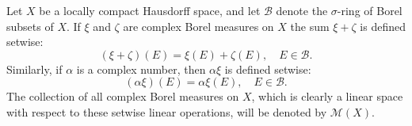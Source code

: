 Let $X$ be a locally compact Hausdorff space, and let $\mathcal{B}$ denote the $\sigma$-ring of Borel subsets of $X$. If $\xi$ and $\zeta$ are complex Borel measures on $X$ the sum $\xi + \zeta$ is defined setwise:
$$(\xi + \zeta)(E) = \xi(E) + \zeta(E), \quad E \in \mathcal{B}.$$
Similarly, if $\alpha$ is a complex number, then $\alpha\xi$ is defined setwise:
$$(\alpha\xi)(E) = \alpha\xi(E), \quad E \in \mathcal{B}.$$
The collection of all complex Borel measures on $X$, which is clearly a linear space with respect to these setwise linear operations, will be denoted by $\mathcal{M}(X)$.
